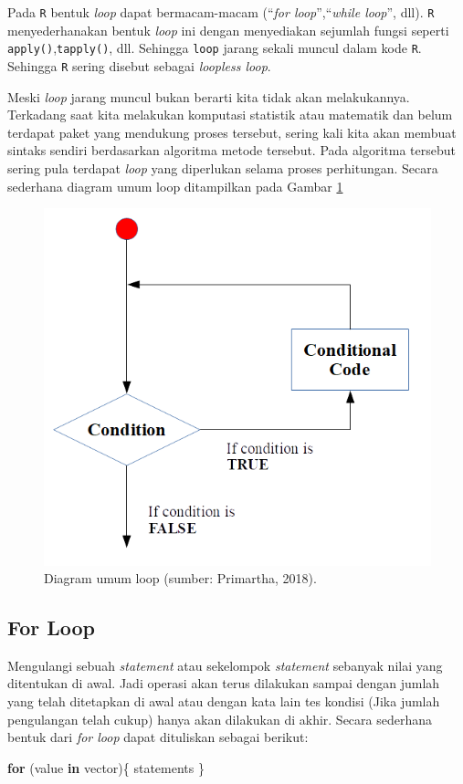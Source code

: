 \documentclass[]{book}
\newenvironment{Shaded}{\begin{snugshade}}{\end{snugshade}}
\newcommand{\ControlFlowTok}[1]{\textcolor[rgb]{0.13,0.29,0.53}{\textbf{#1}}}
\newcommand{\NormalTok}[1]{#1}
\theoremstyle{definition}
\theoremstyle{definition}
\theoremstyle{definition}
\theoremstyle{remark}
\begin{document}
Pada \texttt{R} bentuk \emph{loop} dapat bermacam-macam (``\emph{for loop}'',``\emph{while loop}'', dll). \texttt{R} menyederhanakan bentuk \emph{loop} ini dengan menyediakan sejumlah fungsi seperti \texttt{apply()},\texttt{tapply()}, dll. Sehingga \texttt{loop} jarang sekali muncul dalam kode \texttt{R}. Sehingga \texttt{R} sering disebut sebagai \emph{loopless loop}.

Meski \emph{loop} jarang muncul bukan berarti kita tidak akan melakukannya. Terkadang saat kita melakukan komputasi statistik atau matematik dan belum terdapat paket yang mendukung proses tersebut, sering kali kita akan membuat sintaks sendiri berdasarkan algoritma metode tersebut. Pada algoritma tersebut sering pula terdapat \emph{loop} yang diperlukan selama proses perhitungan. Secara sederhana diagram umum loop ditampilkan pada Gambar \ref{fig:loop}

\begin{figure}

{\centering \includegraphics[width=0.4\linewidth]{./images/skema_loop} 

}

\caption{Diagram umum loop (sumber: Primartha, 2018).}\label{fig:loop}
\end{figure}

\hypertarget{forloop}{%
\subsection{For Loop}\label{forloop}}

Mengulangi sebuah \emph{statement} atau sekelompok \emph{statement} sebanyak nilai yang ditentukan di awal. Jadi operasi akan terus dilakukan sampai dengan jumlah yang telah ditetapkan di awal atau dengan kata lain tes kondisi (Jika jumlah pengulangan telah cukup) hanya akan dilakukan di akhir. Secara sederhana bentuk dari \emph{for loop} dapat dituliskan sebagai berikut:

\begin{Shaded}
\begin{Highlighting}[]
\ControlFlowTok{for}\NormalTok{ (value }\ControlFlowTok{in}\NormalTok{ vector)\{}
\NormalTok{  statements}
\NormalTok{\}}
\end{Highlighting}
\end{Shaded}
\end{document}
